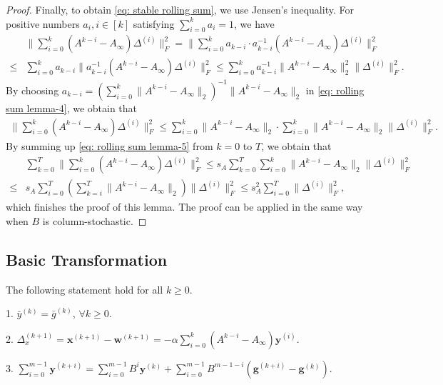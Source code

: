\documentclass{article}
\newcommand{\vg}{{\mathbf{g}}}
\newcommand{\vw}{{\mathbf{w}}}
\newcommand{\vx}{{\mathbf{x}}}
\newcommand{\vy}{{\mathbf{y}}}
\newcommand{\norm}[1]{\| #1 \|}
\begin{document}
\begin{proof}
Finally, to obtain \eqref{eq: stable rolling sum}, we use Jensen's inequality. For positive numbers $a_i, i\in[k]$ satisfying $\sum_{i=0}^k a_i=1$, we have
\begin{align}\label{eq: rolling sum lemma-4}
     &\norm{\sum_{i=0}^k(A^{k-i}-A_\infty)\Delta^{(i)}}_F^2=\norm{\sum_{i=0}^k a_{k-i}\cdot a_{k-i}^{-1}(A^{k-i}-A_\infty)\Delta^{(i)}}_F^2\nonumber\\
    \le& \sum_{i=0}^k a_{k-i}\norm{a_{k-i}^{-1}(A^{k-i}-A_\infty)\Delta^{(i)}}_F^2\le \sum_{i=0}^k a_{k-i}^{-1}\norm{A^{k-i}-A_\infty}_2^2\norm{\Delta^{(i)}}_F^2.
\end{align}
By choosing $a_{k-i}=(\sum_{i=0}^k\norm{A^{k-i}-A_\infty}_2)^{-1}\norm{A^{k-i}-A_\infty}_2$ in \eqref{eq: rolling sum lemma-4}, we obtain that
\begin{align}\label{eq: rolling sum lemma-5}
    \norm{\sum_{i=0}^k(A^{k-i}-A_\infty)\Delta^{(i)}}_F^2\le \sum_{i=0}^k\norm{A^{k-i}-A_\infty}_2\cdot\sum_{i=0}^k\norm{A^{k-i}-A_\infty}_2\norm{\Delta^{(i)}}_F^2.
\end{align}
By summing up \eqref{eq: rolling sum lemma-5} from $k=0$ to $T$, we obtain that  
\begin{align*}
    &\sum_{k=0}^T\norm{\sum_{i=0}^k(A^{k-i}-A_\infty)\Delta^{(i)}}_F^2 \le s_A\sum_{k=0}^T\sum_{i=0}^k\norm{A^{k-i}-A_\infty}_2\norm{\Delta^{(i)}}_F^2\nonumber\\
    \le& s_A \sum_{i=0}^T(\sum_{k=i}^T\norm{A^{k-i}-A_\infty}_2)\norm{\Delta^{(i)}}_F^2\le s_A^2\sum_{i=0}^T\norm{\Delta^{(i)}}_F^2,
\end{align*}
which finishes the proof of this lemma. The proof can be applied in the same way when $B$ is column-stochastic.
    
\end{proof}


\subsection{Basic Transformation}
The following statement hold for all $k\geq0$.

1. $\bar{y}^{(k)}=\bar{g}^{(k)}$, $\forall k\geq 0$. \label{eq:basic_transformation_1}

2. $\Delta_{x}^{(k+1)}=\vx^{(k+1)}-\vw^{(k+1)}=-\alpha\sum_{i=0}^{k}(A^{k-i}-A_{\infty})\vy^{(i)}$. \label{eq:basic_transformation_2}

3. $\sum_{i=0}^{m-1}\vy^{(k+i)}=\sum_{i=0}^{m-1}B^i\vy^{(k)}+\sum_{i=0}^{m-1}B^{m-1-i}(\vg^{(k+i)}-\vg^{(k)})$. \label{eq:basic_transformation_3}
\end{document}
